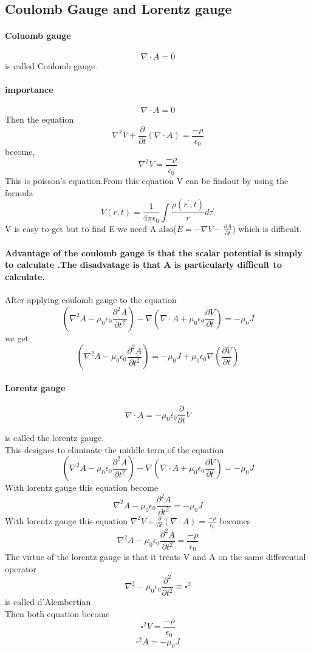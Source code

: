 \subsection{Coulomb Gauge and Lorentz gauge}
\paragraph{Coluomb gauge}
$$\nabla \cdot A=0$$ is called Coulomb gauge.\\
\paragraph{importance}
$$\nabla \cdot A=0$$ Then the equation 
$$\nabla ^2V+\frac{\partial }{\partial t}(\nabla \cdot A)=\frac{-\rho}{\epsilon_{0}}$$ become,\\
$$\nabla^2 V=\frac{-\rho}{\epsilon_{0}}$$
This is poisson's equation.From this equation V can be findout by using the formula\\
$$V(r,t)=\frac{1}{4 \pi \epsilon_0}\int \frac{\rho(r^{\prime},t)}{r}d\tau^{\prime}$$
V is easy to get but to find E we need  A also($E=-\nabla V-\frac{\partial A}{\partial t}$) which is difficult.
\paragraph{Advantage of the coulomb gauge is that the scalar potential is simply to calculate .The disadvatage is that  A is particularly difficult to calculate. }
After applying coulomb gauge to the equation 
$$\left( \nabla^2A-\mu_{0}\epsilon_{0}\frac{\partial^2 A}{\partial t^2}\right) -\nabla\left( \nabla \cdot A+\mu_{0}\epsilon_{0}\frac{\partial V}{\partial t}\right) =-\mu_{0} J$$ 
we get\\
$$\left( \nabla^2A-\mu_{0}\epsilon_{0}\frac{\partial^2 A}{\partial t^2}\right)=-\mu_{0}J+\mu_{0} \epsilon_{0}\nabla \left( \frac{\partial V}{\partial t}\right) $$
\paragraph{Lorentz gauge}
$$\nabla \cdot A =-\mu_{0} \epsilon_{0} \frac{\partial}{\partial t}V$$

 is called the lorentz gauge.\\
 This designes to eliminate the middle term of the equation
$$\left( \nabla^2A-\mu_{0}\epsilon_{0}\frac{\partial^2 A}{\partial t^2}\right) -\nabla\left( \nabla \cdot A+\mu_{0}\epsilon_{0}\frac{\partial V}{\partial t}\right) =-\mu_{0} J$$
With lorentz gauge this equation become
$$\nabla^2A-\mu_{0}\epsilon_{0}\frac{\partial^2 A}{\partial t^2}=-\mu_{0} J$$
With lorentz gauge this equation 
$\nabla ^2V+\frac{\partial }{\partial t}(\nabla \cdot A)=\frac{-\rho}{\epsilon_{0}}$
becomes
$$\nabla^2A-\mu_{0}\epsilon_{0}\frac{\partial^2 A}{\partial t^2}=\frac{-\rho}{\epsilon_{0}}$$
The virtue of the lorentz gauge is that it treats V and A on the same differential operator
$$\nabla^2-\mu_{0} \epsilon_{0}\frac{\partial ^2}{\partial t^2}\equiv \square^2  $$
 is called d'Alembertian\\
Then both equation become\\
$$\square^2V=\frac{-\rho}{\epsilon_{0}}$$
$$\square^2A=-\mu_{0} J$$
